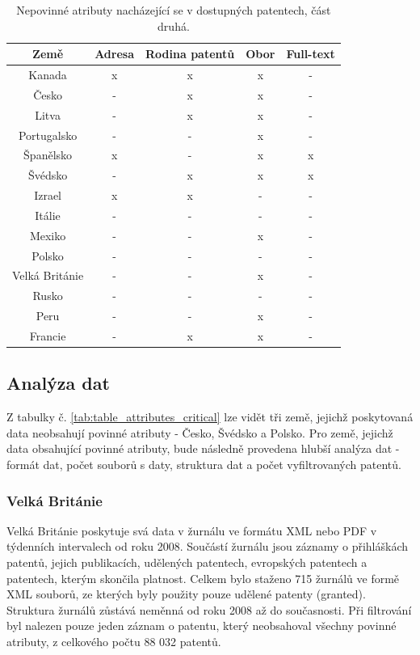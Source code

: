 	\begin{table}[H]
	\centering
	\begin{tabular}{|c|c|c|c|c|} 
	\hline
	\textbf{Země}    &  \textbf{Adresa} & \textbf{Rodina patentů} & \textbf{Obor} & \textbf{Full-text} \\
	\hline
	Kanada & x & x & x & - \\
	\hline
	Česko & - & x & x & - \\
	\hline
	Litva & - & x & x & - \\
	\hline
	Portugalsko & - & - & x & - \\
	\hline
	Španělsko & x & - & x & x \\
	\hline
	Švédsko & - & x & x & x \\
	\hline
	Izrael & x & x & - & - \\
	\hline
	Itálie & - & - & - & - \\
	\hline
	Mexiko & - & - & x & - \\
	\hline
	Polsko & - & - & - & - \\
	\hline
	Velká Británie & - & - & x & - \\
	\hline
	Rusko & - & - & - & - \\
	\hline
	Peru & - & - & x & - \\
	\hline
	Francie & - & x & x & - \\
	\hline
	\end{tabular}
	\caption{Nepovinné atributy nacházející se v dostupných patentech, část druhá.}
	\label{tab:table_attributes_notcrit2}
	\end{table}

\subsection{Analýza dat}
Z tabulky č. \ref{tab:table_attributes_critical} lze vidět tři země, jejichž poskytovaná data neobsahují povinné atributy - Česko, Švédsko a Polsko. Pro země, jejichž data obsahující povinné atributy, bude následně provedena hlubší analýza dat - formát dat, počet souborů s daty, struktura dat a počet vyfiltrovaných patentů.

\subsubsection{Velká Británie}
Velká Británie poskytuje svá data v žurnálu ve formátu \gls{XML} nebo \gls{PDF} v týdenních intervalech od roku 2008. Součástí žurnálu jsou záznamy o přihláškách patentů, jejich publikacích, udělených patentech, evropských patentech a patentech, kterým skončila platnost. 
\newline
\indent Celkem bylo staženo 715 žurnálů ve formě \gls{XML} souborů, ze kterých byly použity pouze udělené patenty (granted). Struktura žurnálů zůstává neměnná od roku 2008 až do současnosti. Při filtrování byl nalezen pouze jeden záznam o patentu, který neobsahoval  všechny povinné atributy, z celkového počtu 88 032 patentů.

